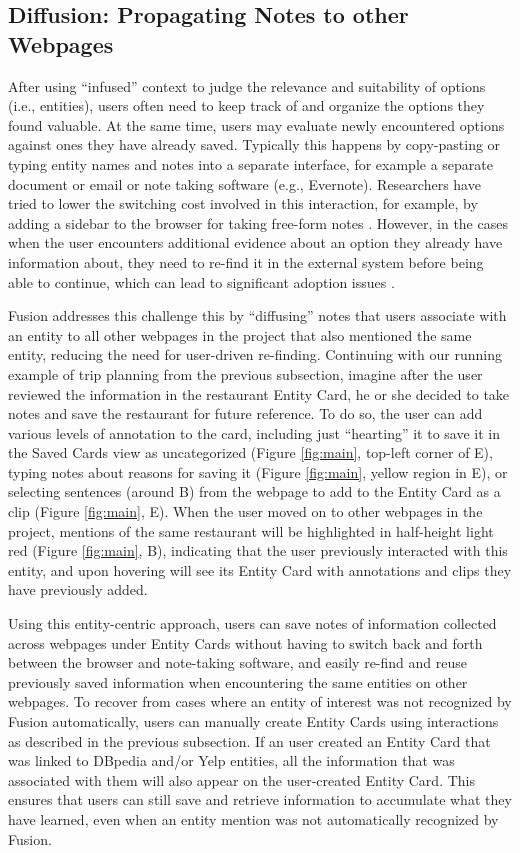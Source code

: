 \subsection{Diffusion: Propagating Notes to other Webpages}

After using ``infused'' context to judge the relevance and suitability of options (i.e., entities), users often need to keep track of and organize the options they found valuable. At the same time, users may evaluate newly encountered options against ones they have already saved. Typically this happens by copy-pasting or typing entity names and notes into a separate interface, for example a separate document or email or note taking software (e.g., Evernote). Researchers have tried to lower the switching cost involved in this interaction, for example, by adding a sidebar to the browser for taking free-form notes \cite{notetoself}. However, in the cases when the user encounters additional evidence about an option they already have information about, they need to re-find it in the external system before being able to continue, which can lead to significant adoption issues \cite{notetoself}.

Fusion addresses this challenge this by ``diffusing'' notes that users associate with an entity to all other webpages in the project that also mentioned the same entity, reducing the need for user-driven re-finding. Continuing with our running example of trip planning from the previous subsection, imagine after the user reviewed the information in the restaurant Entity Card, he or she decided to take notes and save the restaurant for future reference. To do so, the user can add various levels of annotation to the card, including just ``hearting'' it to save it in the Saved Cards view as uncategorized  (Figure \ref{fig:main}, top-left corner of E), typing notes about reasons for saving it (Figure \ref{fig:main}, yellow region in E), or selecting sentences (around B) from the webpage to add to the Entity Card as a clip (Figure \ref{fig:main}, E). When the user moved on to other webpages in the project, mentions of the same restaurant will be highlighted in half-height light red (Figure \ref{fig:main}, B), indicating that the user previously interacted with this entity, and upon hovering will see its Entity Card with annotations and clips they have previously added. 

Using this entity-centric approach, users can save notes of information collected across webpages under Entity Cards without having to switch back and forth between the browser and note-taking software, and easily re-find and reuse previously saved information when encountering the same entities on other webpages. To recover from cases where an entity of interest was not recognized by Fusion automatically, users can manually create Entity Cards using interactions as described in the previous subsection. If an user created an Entity Card that was linked to DBpedia and/or Yelp entities, all the information that was associated with them will also appear on the user-created Entity Card. This ensures that users can still save and retrieve information to accumulate what they have learned, even when an entity mention was not automatically recognized by Fusion.

